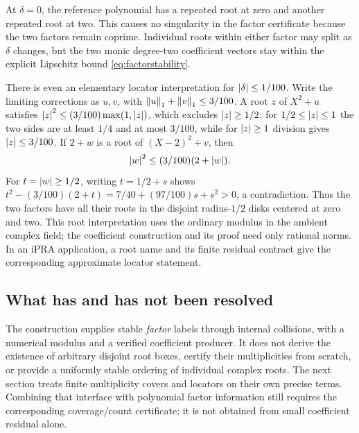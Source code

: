 At \(\delta=0\), the reference polynomial has a repeated root at zero and another repeated root at two. This causes no singularity in the factor certificate because the two factors remain coprime. Individual roots within either factor may split as \(\delta\) changes, but the two monic degree-two coefficient vectors stay within the explicit Lipschitz bound \eqref{eq:factorstability}.

There is even an elementary locator interpretation for \(\left|\delta\right|\le1/100\). Write the limiting corrections as \(u,v\), with \(\left\lVert u\right\rVert_1+\left\lVert v\right\rVert_1\le3/100\). A root \(z\) of \(X^2+u\) satisfies
\(\left|z\right|^2\le(3/100)\max(1,\left|z\right|)\), which excludes \(\left|z\right|\ge1/2\): for \(1/2\le\left|z\right|\le1\) the two sides are at least \(1/4\) and at most \(3/100\), while for \(\left|z\right|\ge1\) division gives \(\left|z\right|\le3/100\). If \(2+w\) is a root of \((X-2)^2+v\), then
\[
 \left|w\right|^2\le(3/100)(2+\left|w\right|).
\]
For \(t=\left|w\right|\ge1/2\), writing \(t=1/2+s\) shows
\(t^2-(3/100)(2+t)=7/40+(97/100)s+s^2>0\), a contradiction. Thus the two factors have all their roots in the disjoint radius-\(1/2\) disks centered at zero and two. This root interpretation uses the ordinary modulus in the ambient complex field; the coefficient construction and its proof need only rational norms. In an iPRA application, a root name and its finite residual contract give the corresponding approximate locator statement.

\subsection{What has and has not been resolved}

The construction supplies stable \emph{factor} labels through internal collisions, with a numerical modulus and a verified coefficient producer. It does not derive the existence of arbitrary disjoint root boxes, certify their multiplicities from scratch, or provide a uniformly stable ordering of individual complex roots. The next section treats finite multiplicity covers and locators on their own precise terms. Combining that interface with polynomial factor information still requires the corresponding coverage/count certificate; it is not obtained from small coefficient residual alone.
